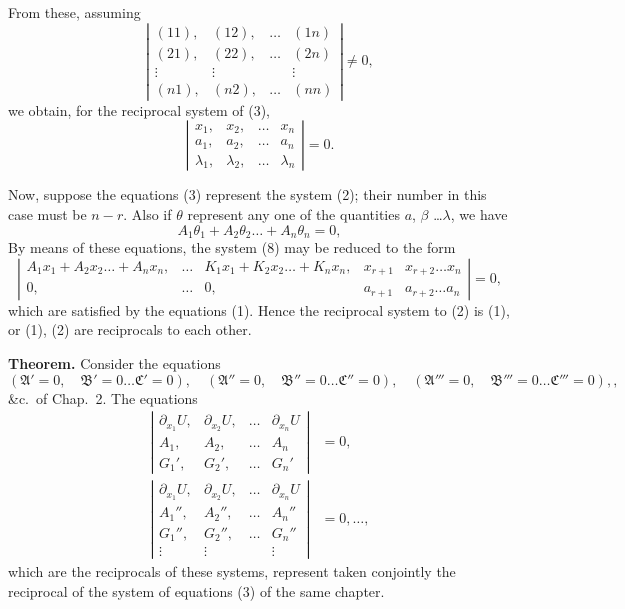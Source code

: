\documentclass[11pt,a4paper]{article}
\theoremstyle{plain}
\theoremstyle{definition}
\theoremstyle{remark}
\begin{document}
From these, assuming
\[
\left|\begin{array}{cccc}
(11), & (12), & \ldots & (1n) \\
(21), & (22), & \ldots & (2n) \\
\vdots & \vdots & & \vdots \\
(n1), & (n2), & \ldots & (nn)
\end{array}\right| \neq 0
\tag{7},
\]
we obtain, for the reciprocal system of (3),
\[
\left|
\begin{array}{ccccc}
x_1, & x_2, & \ldots & x_n \\
a_1, & a_2, & \ldots & a_n \\
\lambda_1, & \lambda_2, & \ldots & \lambda_n
\end{array}
\right| = 0
\tag{8}.
\]

Now, suppose the equations (3) represent the system (2); their number in this case
must be $n-r$. Also if $\theta$ represent any one of the quantities $a$, $\beta$ \ldots $\lambda$, we have
\[
A_1 \theta_1 + A_2 \theta_2 \ldots + A_n \theta_n = 0 \tag{10},
\]
By means of these equations, the system (8) may be reduced to the form
\[
\left|
\begin{array}{ccccc}
A_1 x_1 + A_2 x_2 \ldots + A_n x_n, & \ldots & K_1 x_1 + K_2 x_2 \ldots + K_n x_n, & x_{r+1} & x_{r+2} \ldots x_n \\
0, & \ldots & 0, & a_{r+1} & a_{r+2} \ldots a_n
\end{array}
\right| = 0
\tag{11},
\]
which are satisfied by the equations (1). Hence the reciprocal system to (2) is (1),
or (1), (2) are reciprocals to each other.

\newpage
\textbf{Theorem.} Consider the equations
\[
(\mathfrak{A}'=0, \quad \mathfrak{B}'=0 \ldots \mathfrak{C}'=0),
\quad (\mathfrak{A}''=0, \quad \mathfrak{B}''=0 \ldots \mathfrak{C}''=0),
\quad (\mathfrak{A}'''=0, \quad \mathfrak{B}'''=0 \ldots \mathfrak{C}'''=0),
\tag{12},
\]
\&c.\ of Chap.\ 2. The equations
\begin{align*}
\left|
\begin{array}{cccc}
\partial_{x_1} U, & \partial_{x_2} U, & \ldots & \partial_{x_n} U \\
A_1, & A_2, & \ldots & A_n \\
G_1', & G_2', & \ldots & G_n'
\end{array}
\right| &= 0, \\
\left|
\begin{array}{cccc}
\partial_{x_1} U, & \partial_{x_2} U, & \ldots & \partial_{x_n} U \\
A_1'', & A_2'', & \ldots & A_n'' \\
G_1'', & G_2'', & \ldots & G_n'' \\
\vdots & \vdots & & \vdots
\end{array}
\right| &= 0, \ldots \tag{13},
\end{align*}
which are the reciprocals of these systems, represent taken conjointly the reciprocal of
the system of equations (3) of the same chapter.
\end{document}

